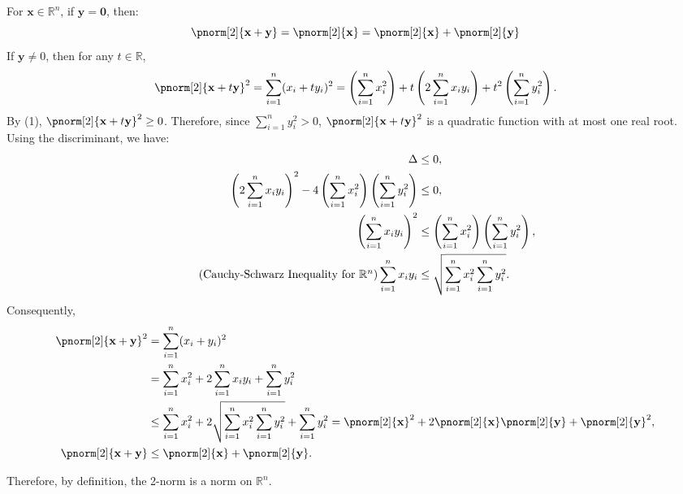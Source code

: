 \documentclass{huhtakm-template-book-v2}
\begin{document}
\begin{proofing}
\begin{enumerate}
            For $\mathbf{x} \in \mathbb{R}^{n}$, if $\mathbf{y} = \mathbf{0}$, then:
            \begin{equation*}
            	\pnorm[2]{\mathbf{x} + \mathbf{y}} = \pnorm[2]{\mathbf{x}} = \pnorm[2]{\mathbf{x}} + \pnorm[2]{\mathbf{y}}
            \end{equation*}
            If $\mathbf{y} \neq 0$, then for any $t \in \mathbb{R}$,
            \begin{equation*}
                \pnorm[2]{\mathbf{x} + t\mathbf{y}}^{2} = \sum_{i=1}^{n}(x_{i} + ty_{i})^{2} = \left(\sum_{i=1}^{n}x_{i}^{2}\right) + t\left(2\sum_{i=1}^{n}x_{i}y_{i}\right) + t^{2}\left(\sum_{i=1}^{n}y_{i}^{2}\right).
            \end{equation*}
            By (1), $\pnorm[2]{\mathbf{x} + t\mathbf{y}}^{2} \geq 0$. Therefore, since $\sum_{i=1}^{n} y_{i}^{2}>0$, $\pnorm[2]{\mathbf{x} + t\mathbf{y}}^{2}$ is a quadratic function with at most one real root. Using the discriminant, we have:
            \begin{align*}
                \Delta &\leq 0,\\
                \left(2\sum_{i=1}^{n}x_{i}y_{i}\right)^{2} - 4\left(\sum_{i=1}^{n}x_{i}^{2}\right)\left(\sum_{i=1}^{n}y_{i}^{2}\right) &\leq 0,\\
                \left(\sum_{i=1}^{n}x_{i}y_{i}\right)^{2} &\leq \left(\sum_{i=1}^{n}x_{i}^{2}\right)\left(\sum_{i=1}^{n}y_{i}^{2}\right),\\
                \tag{Cauchy-Schwarz Inequality for $\mathbb{R}^{n}$}
                \sum_{i=1}^{n}x_{i}y_{i} &\leq \sqrt{\sum_{i=1}^{n}x_{i}^{2}\sum_{i=1}^{n}y_{i}^{2}}.
            \end{align*}
            Consequently, 
            \begin{align*}
                \pnorm[2]{\mathbf{x} + \mathbf{y}}^{2} &= \sum_{i=1}^{n}(x_{i} + y_{i})^{2}\\
                &= \sum_{i=1}^{n}x_{i}^{2} + 2\sum_{i=1}^{n}x_{i}y_{i} + \sum_{i=1}^{n}y_{i}^{2}\\
                &\leq \sum_{i=1}^{n}x_{i}^{2} + 2\sqrt{\sum_{i=1}^{n}x_{i}^{2}\sum_{i=1}^{n}y_{i}^{2}} + \sum_{i=1}^{n}y_{i}^{2} = \pnorm[2]{\mathbf{x}}^{2} + 2\pnorm[2]{\mathbf{x}}\pnorm[2]{\mathbf{y}} + \pnorm[2]{\mathbf{y}}^{2},\\
                \pnorm[2]{\mathbf{x} + \mathbf{y}} &\leq \pnorm[2]{\mathbf{x}} + \pnorm[2]{\mathbf{y}}.
            \end{align*}
        \end{enumerate}
        Therefore, by definition, the 2-norm is a norm on $\mathbb{R}^{n}$.
    \end{proofing}
    \newpage
\end{document}
